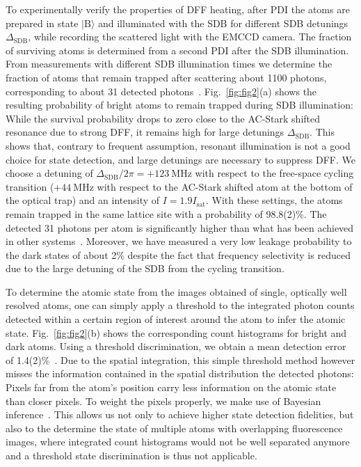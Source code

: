 \documentclass[aps,prl,twocolumn,english,showpacs]{revtex4-1}
\begin{document}
To experimentally verify the properties of DFF heating, after PDI the atoms are prepared in state $\vert \text{B} \rangle$ and illuminated with the SDB for different SDB detunings $\Delta_\text{SDB}$, while recording the scattered light with the EMCCD camera. The fraction of surviving atoms is determined from  a second PDI after the SDB illumination. From measurements with different SDB illumination times we determine the fraction of atoms that remain trapped after scattering about 1100 photons, corresponding to about 31 detected photons~\cite{LongPaper}. Fig.~\ref{fig:fig2}(a) shows the resulting probability of bright atoms to remain trapped during SDB illumination: While the survival probability drops to zero close to the AC-Stark shifted resonance due to strong DFF, it remains high for large detunings $\Delta_\text{SDB}$. This shows that, contrary to frequent assumption, resonant illumination is not a good choice for state detection, and large detunings are necessary to suppress DFF. We choose a detuning of $\Delta_\text{SDB}/2\pi= +\SI{123}{\mega\hertz}$ with respect to the free-space cycling transition ($+\SI{44}{\mega\hertz}$ with respect to the AC-Stark shifted atom at the bottom of the optical trap) and an intensity of $I = 1.9 I_\text{sat}$. With these settings, the atoms remain trapped in the same lattice site with a probability of 98.8(2)\%. The detected 31 photons per atom is significantly higher than what has been achieved in other systems~\cite{gibbons2011,fuhrmanek2011}. Moreover, we have measured a very low leakage probability to the dark states of about 2\% despite the fact that frequency selectivity is reduced due to the large detuning of the SDB from the cycling transition.
 
To determine the atomic state from the images obtained of single, optically well resolved atoms, one can simply apply a threshold to the integrated photon counts detected within a certain region of interest around the atom to infer the atomic state. Fig.~\ref{fig:fig2}(b) shows the corresponding count histograms for bright and dark atoms. Using a  threshold discrimination, we obtain a mean detection error of 1.4(2)\%~\cite{LongPaper}. Due to the spatial integration, this simple threshold method however misses the information contained in the spatial distribution the detected photons: Pixels far from the atom's position carry less information on the atomic state than closer pixels. To weight the pixels properly, we make use of Bayesian inference~\cite{sivia2006data}. This allows us not only to achieve higher state detection fidelities, but also to the determine the state of multiple atoms with overlapping fluorescence images, where integrated count histograms would not be well separated anymore and a threshold state discrimination is thus not applicable.
\end{document}
